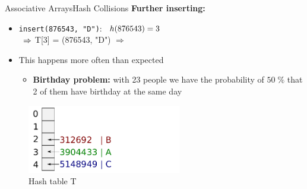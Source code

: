 \begin{frame}{Associative Arrays}{Hash Collisions}
  \textbf{Further inserting:}
  \begin{itemize}
    \item<1->
      \texttt{insert(876543, "D")}:
      $\hspace*{0.5em} h(876543) = 3$\\
      $\hspace*{0.5em} \Rightarrow$
      T[3] = (876543, "D")
      $\Rightarrow$ {\color{red}{Collision}}
    \item<3->
      This happens more often than expected
      \begin{itemize}
        \item
          \textbf{Birthday problem:}
          with 23 people we have the probability of $50\;\%$ that 2 of
          them have birthday at the same day
      \end{itemize}
  \end{itemize}
  \vspace*{-1.0em}
  \begin{figure}
    \caption{Hash table T}
    \centering
       \includegraphics[width=0.6\textwidth]{Images/Bucket4.pdf}
  \end{figure}
\end{frame}


